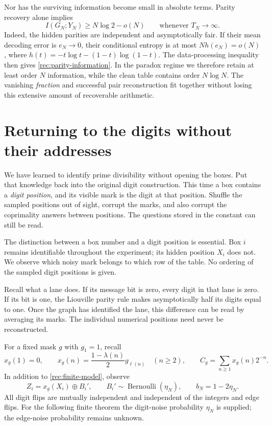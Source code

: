 Nor has the surviving information become small in absolute terms.
Parity recovery alone implies
\begin{equation}\label{rec:parity-information}
 I(G_N;Y_N)\ge N\log2-o(N)
 \qquad\text{whenever }T_N\to\infty.
\end{equation}
Indeed, the hidden parities are independent and asymptotically fair.
If their mean decoding error is $e_N\to0$, their conditional entropy
is at most $N h(e_N)=o(N)$, where
$h(t)=-t\log t-(1-t)\log(1-t)$. The data-processing inequality then
gives \eqref{rec:parity-information}. In the paradox regime we therefore
retain at least order $N$ information, while the clean table contains
order $N\log N$. The vanishing \emph{fraction} and successful pair
reconstruction fit together without losing this extensive amount of
recoverable arithmetic.

\section{Returning to the digits without their addresses}\label{rec:digits-return}

We have learned to identify prime divisibility without opening the
boxes. Put that knowledge back into the original digit construction.
This time a box contains a \emph{digit position}, and its visible mark
is the digit at that position. Shuffle the sampled positions out of
sight, corrupt the marks, and also corrupt the coprimality answers
between positions. The questions stored in the constant can still be
read.

The distinction between a box number and a digit position is essential.
Box $i$ remains identifiable throughout the experiment; its hidden
position $X_i$ does not. We observe which noisy mark belongs to which
row of the table. No ordering of the sampled digit positions is given.

Recall what a lane does. If its message bit is zero, every digit in
that lane is zero. If its bit is one, the Liouville parity rule makes
asymptotically half its digits equal to one. Once the graph has
identified the lane, this difference can be read by averaging its marks.
The individual numerical positions need never be reconstructed.

For a fixed mask $g$ with $g_1=1$, recall
\[
 x_g(1)=0,\qquad
 x_g(n)=\frac{1-\lambda(n)}2g_{\ell(n)}\quad(n\ge2),\qquad
 C_g=\sum_{n\ge1}x_g(n)2^{-n}.
\]
In addition to \eqref{rec:finite-model}, observe
\[
 Z_i=x_g(X_i)\mathbin{\oplus}B_i',\qquad
 B_i'\sim\operatorname{Bernoulli}(\eta_N),
 \qquad b_N=1-2\eta_N.
\]
All digit flips are mutually independent and independent of the integers
and edge flips. For the following finite theorem the digit-noise
probability $\eta_N$ is supplied; the edge-noise probability remains
unknown.

